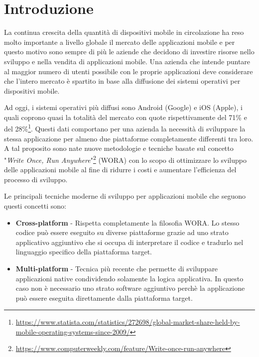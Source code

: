 
\section{Introduzione}
La continua crescita della quantità di dispositivi mobile in circolazione ha reso molto importante a livello globale il mercato delle applicazioni mobile e per questo motivo sono sempre di più le aziende che decidono di investire risorse nello sviluppo e nella vendita di applicazioni mobile. Una azienda che intende puntare al maggior numero di utenti possibile con le proprie applicazioni deve considerare che l'intero mercato è spartito in base alla diffusione dei sistemi operativi per dispositivi mobile. 

Ad oggi, i sistemi operativi più diffusi sono Android (Google) e iOS (Apple), i quali coprono quasi la totalità del mercato con quote rispettivamente del 71\% e del 28\%\footnote{\href{https://www.statista.com/statistics/272698/global-market-share-held-by-mobile-operating-systems-since-2009/}{https://www.statista.com/statistics/272698/global-market-share-held-by-mobile-operating-systems-since-2009/}}. Questi dati comportano per una azienda la necessità di sviluppare la stessa applicazione per almeno due piattaforme completamente differenti tra loro. A tal proposito sono nate nuove metodologie e tecniche basate sul concetto "\textit{Write Once, Run Anywhere}"\footnote{\href{https://www.computerweekly.com/feature/Write-once-run-anywhere}{https://www.computerweekly.com/feature/Write-once-run-anywhere}} (WORA) con lo scopo di ottimizzare lo sviluppo delle applicazioni mobile al fine di ridurre i costi e aumentare l'efficienza del processo di sviluppo.

Le principali tecniche moderne di sviluppo per applicazioni mobile che seguono questi concetti sono:
\begin{itemize}
    \item \textbf{Cross-platform} - Rispetta completamente la filosofia WORA. Lo stesso codice può essere eseguito su diverse piattaforme grazie ad uno strato applicativo aggiuntivo che si occupa di interpretare il codice e tradurlo nel linguaggio specifico della piattaforma target.
    \item \textbf{Multi-platform} - Tecnica più recente che permette di sviluppare applicazioni native condividendo solamente la logica applicativa. In questo caso non è necessario uno strato software aggiuntivo perchè la applicazione può essere eseguita direttamente dalla piattaforma target.
\end{itemize}


